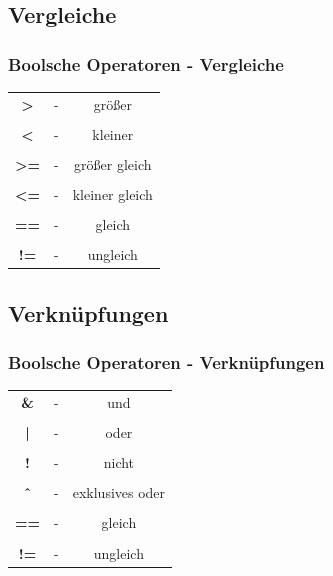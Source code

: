 \documentclass[final]{beamer}
\begin{document}
\subsection{Vergleiche}
\begin{frame}
	\frametitle{Boolsche Operatoren - Vergleiche}
	\begin{tabular}{c c c}
		\textbf{>}  & - & größer \\&&\\
		\textbf{<} & - & kleiner \\&&\\
		\textbf{>=} & - & größer gleich \\&&\\
		\textbf{<=}  & - &  kleiner gleich \\&&\\
		\textbf{==} & - & gleich \\&&\\
		\textbf{!=} & - & ungleich \\
	\end{tabular}
\end{frame}

\subsection{Verknüpfungen}
\begin{frame}
	\frametitle{Boolsche Operatoren - Verknüpfungen}
	\begin{tabular}{c c c}
		\textbf{\&}  & - & und \\&&\\
		\textbf{|} & - & oder \\&&\\
		\textbf{!} & - & nicht \\&&\\
		\textbf{\^\ }  & - &  exklusives oder \\&&\\
		\textbf{==} & - & gleich \\&&\\
		\textbf{!=} & - & ungleich \\
	\end{tabular}
\end{frame}
\end{document}
